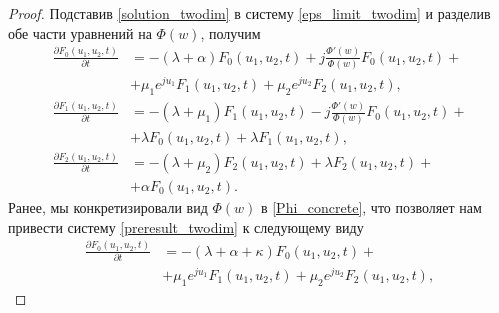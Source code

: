 \begin{proof}
	Подставив \eqref{solution_twodim} в систему \eqref{eps_limit_twodim} и разделив обе части уравнений на $\Phi(w)$, получим
	\begin{equation} \label{preresult_twodim}
		\begin{split}
			\frac{{\partial F_{0}(u_{1},u_{2},t)}}{{\partial t}} &= -(\lambda + \alpha)F_{0}(u_{1},u_{2},t) + j
			\frac{\Phi'(w) }{\Phi(w)}F_{0}(u_{1},u_{2},t) +\\  &+ \mu_{1} e^{ju_{1}}F_{1}(u_{1},u_{2},t) + \mu_{2}e^{ju_{2}}F_{2}(u_{1},u_{2},t) ,
			\\
			\frac{{\partial F_{1}(u_{1},u_{2},t)}}{{\partial t}} &= -(\lambda + \mu_{1})F_{1}(u_{1},u_{2},t) - j 
			\frac{\Phi'(w) }{\Phi(w)}F_{0}(u_{1},u_{2},t) +\\  &+ \lambda F_{0}(u_{1},u_{2},t) + \lambda F_{1}(u_{1},u_{2},t) ,
			\\
			\frac{{\partial F_{2}(u_{1},u_{2},t)}}{{\partial t}} &= -(\lambda + \mu_{2})F_{2}(u_{1},u_{2},t)  + \lambda F_{2}(u_{1},u_{2},t) +\\  &+ \alpha F_{0}(u_{1},u_{2},t).
		\end{split}
	\end{equation}  
	Ранее, мы конкретизировали вид $\Phi(w)$ в \eqref{Phi_concrete}, что позволяет нам привести систему \eqref{preresult_twodim} к следующему виду	
	\begin{equation} \label{result_twodim}
		\begin{split}
			\frac{{\partial F_{0}(u_{1},u_{2},t)}}{{\partial t}} &= -(\lambda + \alpha+ \kappa)F_{0}(u_{1},u_{2},t) + \\  &+ \mu_{1} e^{ju_{1}}F_{1}(u_{1},u_{2},t) + \mu_{2}e^{ju_{2}}F_{2}(u_{1},u_{2},t) ,

\end{split}
\end{equation}
\end{proof}
